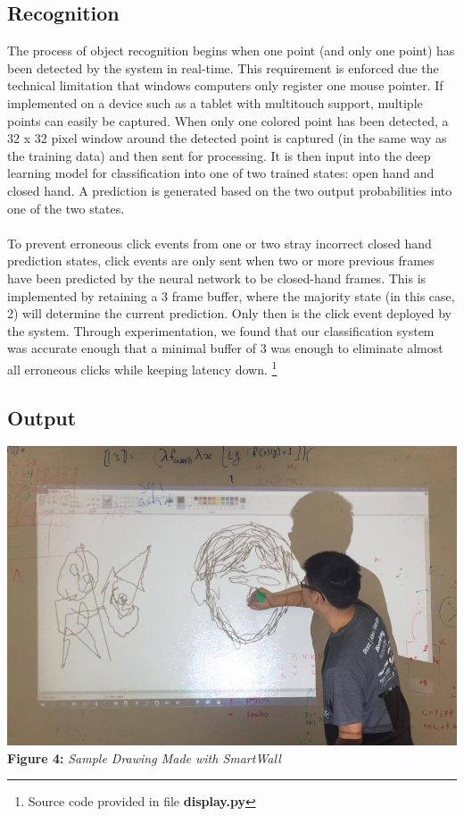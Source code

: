 \documentclass[twoside,twocolumn]{article}
\begin{document}
\subsection{Recognition}
The process of object recognition begins when one point (and only one point) has been detected by the system in real-time. This requirement is enforced due the technical limitation that windows computers only register one mouse pointer. If implemented on a device such as a tablet with multitouch support, multiple points can easily be captured. When only one colored point has been detected, a 32 x 32 pixel window around the detected point is captured (in the same way as the training data) and then sent for processing. It is then input into the deep learning model for classification into one of two trained states: open hand and closed hand. A prediction is generated based on the two output probabilities into one of the two states. \\ \\ To prevent erroneous click events from one or two stray incorrect closed hand prediction states, click events are only sent when two or more previous frames have been predicted by the neural network to be closed-hand frames. This is implemented by retaining a 3 frame buffer, where the majority state (in this case, 2) will determine the current prediction. Only then is the click event deployed by the system. Through experimentation, we found that our classification system was accurate enough that a minimal buffer of 3 was enough to eliminate almost all erroneous clicks while keeping latency down. \footnote{Source code provided in file \textbf{display.py}}

\subsection{Output}

\begin{center}
	\includegraphics[scale=0.19]{sample} \\
	\vspace{0.25cm}
	\small{\textbf{Figure 4:} \textit{Sample Drawing Made with SmartWall}}
\end{center}
\end{document}
